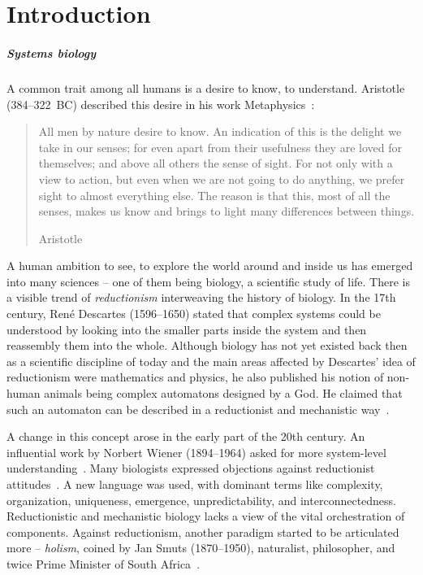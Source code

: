 \documentclass[
	digital, oneside, nosansbold, nocolorbold, nolot, nolof
]{fithesis4}
\theoremstyle{definition}
\theoremstyle{definition}
\begin{document}
\chapter{Introduction}

\paragraph{Systems biology}

A common trait among all humans is a desire to know, to understand. Aristotle
(384--322~BC) described this desire in his work Metaphysics~\cite{aristotle}:

\blockquote[Aristotle]{All men by nature desire to know. An indication of this
    is the delight we take in our senses; for even apart from their usefulness
    they are loved for themselves; and above all others the sense of sight. For
    not only with a view to action, but even when we are not going to do
    anything, we prefer sight to almost everything else. The reason is that
    this, most of all the senses, makes us know and brings to light many
    differences between things.}

A human ambition to see, to explore the world around and inside us has emerged
into many sciences -- one of them being biology, a scientific study of life.
There is a visible trend of \emph{reductionism} interweaving the history of
biology. In the 17th century, René Descartes (1596--1650) stated that complex
systems could be understood by looking into the smaller parts inside the system
and then reassembly them into the whole. Although biology has not yet existed
back then as a scientific discipline of today and the main areas affected by
Descartes' idea of reductionism were mathematics and physics, he also published
his notion of non-human animals being complex automatons designed by a God. He
claimed that such an automaton can be described in a reductionist and
mechanistic way~\cite{systems_bio_hist, de_homine}.

A change in this concept arose in the early part of the 20th century. An
influential work by Norbert Wiener (1894--1964) asked for more system-level
understanding~\cite{cybernetics}.  Many biologists expressed objections against
reductionist attitudes~\cite{woodger_biological, weiss_problem, ludwig_open}. A
new language was used, with dominant terms like complexity, organization,
uniqueness, emergence, unpredictability, and interconnectedness. Reductionistic
and mechanistic biology lacks a view of the vital orchestration of components.
Against reductionism, another paradigm started to be articulated more --
\emph{holism}, coined by Jan Smuts (1870--1950), naturalist, philosopher, and
twice Prime Minister of South Africa~\cite{smuts_holism}.
\end{document}
